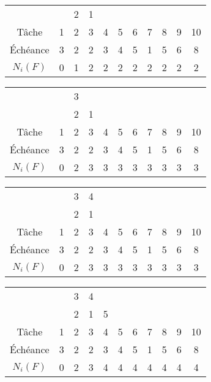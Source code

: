\documentclass[11pt]{article}
\begin{document}
\begin{center}
\begin{tabular}{ |c| c c c c c c c c  c c |}
 \hline 
 & & 2 & 1 & & & & & & & \\ 
Tâche & 1 & 2 & 3 & 4  & 5 & 6 & 7 & 8 & 9 & 10 \\ 
 \hline 
Échéance & 3 & 2 & 2 & 3  & 4 & 5 & 1 & 5 & 6 & 8  \\
 \hline
 $N_{i}(F)$ & 0 & 1 & 2 & 2 & 2 & 2 & 2 & 2 & 2 & 2 \\
 
  \hline 
\end{tabular}
\end{center}

\begin{center}
\begin{tabular}{ |c| c c c c c c c c  c c |}
 \hline 
&  & 3 & & & & & & & & \\   
 & & 2 & 1 & & & & & & & \\ 
Tâche & 1 & 2 & 3 & 4  & 5 & 6 & 7 & 8 & 9 & 10 \\ 
 \hline 
Échéance & 3 & 2 & 2 & 3  & 4 & 5 & 1 & 5 & 6 & 8  \\
 \hline
 $N_{i}(F)$ & 0 & 2 & 3 & 3 & 3 & 3 & 3 & 3 & 3 & 3 \\
 
  \hline 
\end{tabular}
\end{center}

\begin{center}
\begin{tabular}{ |c| c c c c c c c c  c c |}
 \hline 
&  & 3 & {\color{magenta}4} & & & & & & & \\   
 & & 2 & 1 & & & & & & & \\ 
Tâche & 1 & 2 & 3 & 4  & 5 & 6 & 7 & 8 & 9 & 10 \\ 
 \hline 
Échéance & 3 & 2 & 2 & 3  & 4 & 5 & 1 & 5 & 6 & 8  \\
 \hline
 $N_{i}(F)$ & 0 & 2 & 3 & 3 & 3 & 3 & 3 & 3 & 3 & 3 \\
 
  \hline 
\end{tabular}
\end{center}

\begin{center}
\begin{tabular}{ |c| c c c c c c c c  c c |}
 \hline 
&  & 3 & {\color{magenta}4} & & & & & & & \\   
 & & 2 & 1 & 5 & & & & & & \\ 
Tâche & 1 & 2 & 3 & 4  & 5 & 6 & 7 & 8 & 9 & 10 \\ 
 \hline 
Échéance & 3 & 2 & 2 & 3  & 4 & 5 & 1 & 5 & 6 & 8  \\
 \hline
 $N_{i}(F)$ & 0 & 2 & 3 & 4 & 4 & 4 & 4 & 4 & 4 & 4 \\
 
  \hline 
\end{tabular}
\end{center}
\end{document}
